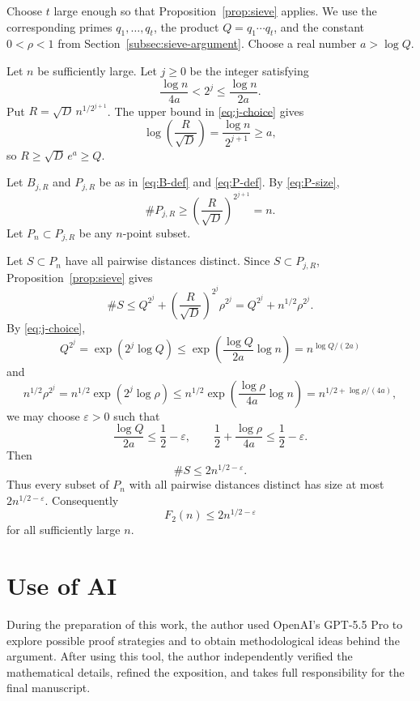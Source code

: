 Choose \(t\) large enough so that Proposition~\ref{prop:sieve} applies.
We use the corresponding primes \(q_1,\ldots,q_t\), the product \(Q=q_1\cdots q_t\), and the constant \(0<\rho<1\) from Section~\ref{subsec:sieve-argument}.
Choose a real number \(a>\log Q\).

Let \(n\) be sufficiently large.
Let \(j\ge0\) be the integer satisfying
\begin{equation}\label{eq:j-choice}
\frac{\log n}{4a}<2^j\le\frac{\log n}{2a}.
\end{equation}
Put \(R=\sqrt D\,n^{1/2^{j+1}}\).
The upper bound in \eqref{eq:j-choice} gives
\[
\log\left(\frac{R}{\sqrt D}\right)
=
\frac{\log n}{2^{j+1}}
\ge a,
\]
so \(R\ge\sqrt D\,e^a\ge Q\).

Let \(B_{j,R}\) and \(P_{j,R}\) be as in \eqref{eq:B-def} and \eqref{eq:P-def}.
By \eqref{eq:P-size},
\[
\#P_{j,R}
\ge
\left(\frac{R}{\sqrt D}\right)^{2^{j+1}}
=n.
\]
Let \(P_n\subset P_{j,R}\) be any \(n\)-point subset.

Let \(S\subset P_n\) have all pairwise distances distinct.
Since \(S\subset P_{j,R}\), Proposition~\ref{prop:sieve} gives
\[
\#S
\le
Q^{2^j}+
\left(\frac{R}{\sqrt D}\right)^{2^j}\rho^{2^j}
=
Q^{2^j}+n^{1/2}\rho^{2^j}.
\]
By \eqref{eq:j-choice},
\[
Q^{2^j}
=
\exp(2^j\log Q)
\le
\exp\left(\frac{\log Q}{2a}\log n\right)
=
n^{\log Q/(2a)}
\]
and
\[
n^{1/2}\rho^{2^j}
=
n^{1/2}\exp(2^j\log\rho)
\le
n^{1/2}\exp\left(\frac{\log\rho}{4a}\log n\right)
=
n^{1/2+\log\rho/(4a)},
\]
we may choose \(\varepsilon>0\) such that
\[
\frac{\log Q}{2a}\le\frac12-\varepsilon,
\qquad
\frac12+\frac{\log\rho}{4a}\le\frac12-\varepsilon.
\]
Then
\[
\#S\le2n^{1/2-\varepsilon}.
\]
Thus every subset of \(P_n\) with all pairwise distances distinct has size at most \(2n^{1/2-\varepsilon}\).
Consequently
\[
F_2(n)
\le
2n^{1/2-\varepsilon}
\]
for all sufficiently large \(n\).

\section*{Use of AI}

During the preparation of this work, the author used OpenAI's GPT-5.5 Pro to explore possible proof strategies and to obtain methodological ideas behind the argument.
After using this tool, the author independently verified the mathematical details, refined the exposition, and takes full responsibility for the final manuscript.






